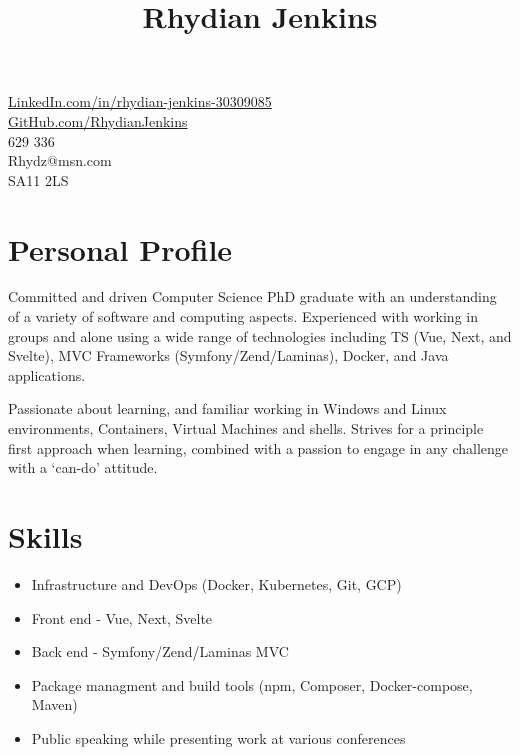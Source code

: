 \documentclass[10pt]{article}
\title{\bfseries\Huge Rhydian Jenkins}
\date{}
\author{}
\begin{document}
\maketitle \vspace{-7em}

\section*{}
\faLinkedin \quad \href{https://www.linkedin.com/in/rhydian-jenkins-30309085/}{LinkedIn.com/in/rhydian-jenkins-30309085}\\
\faGithub \quad \href{https://github.com/RhydianJenkins}{GitHub.com/RhydianJenkins}\\
\faPhone {} 629 336\\
\faEnvelope \quad Rhydz@msn.com\\
\faMapMarker \quad SA11 2LS

\section*{Personal Profile}
\noindent Committed and driven Computer Science PhD graduate with an understanding of a variety of software and computing aspects. Experienced with working in groups and alone using a wide range of technologies including TS (Vue, Next, and Svelte), MVC Frameworks (Symfony/Zend/Laminas), Docker, and Java applications.

Passionate about learning, and familiar working in Windows and Linux environments, Containers, Virtual Machines and shells. Strives for a principle first approach when learning, combined with a passion to engage in any challenge with a `can-do' attitude.

\section*{Skills}
\begin{itemize} \setlength\itemsep{-0.25em}
	\item Infrastructure and DevOps (Docker, Kubernetes, Git, GCP)
	\item Front end - Vue, Next, Svelte
	\item Back end - Symfony/Zend/Laminas MVC
	\item Package managment and build tools (npm, Composer, Docker-compose, Maven)
	\item Public speaking while presenting work at various conferences
\end{itemize}
\end{document}
